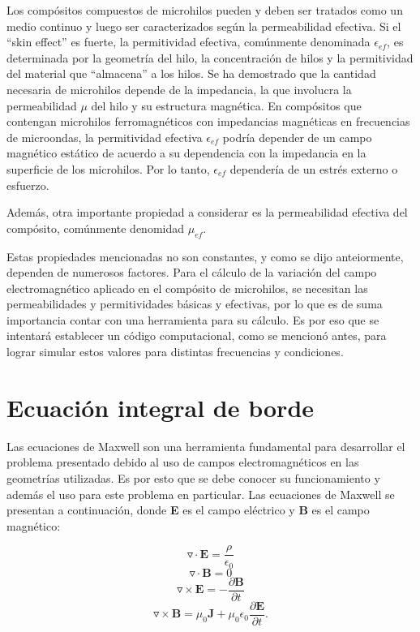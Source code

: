 \documentclass[12pt,letterpaper]{article}
\numberwithin{equation}{section}
\begin{document}
Los compósitos compuestos de microhilos pueden y deben ser tratados como un medio continuo y luego ser caracterizados según la permeabilidad efectiva. Si el ``skin effect'' es fuerte, la permitividad efectiva, comúnmente denominada $\epsilon_{ef}$, es determinada por la geometría del hilo, la concentración de hilos y la permitividad del material que ``almacena'' a los hilos. Se ha demostrado que la cantidad necesaria de microhilos depende de la impedancia, la que involucra la permeabilidad $\mu$ del hilo y su estructura magnética. En compósitos que contengan microhilos ferromagnéticos con impedancias magnéticas en frecuencias de microondas, la permitividad efectiva $\epsilon_{ef}$ podría depender de un campo magnético estático de acuerdo a su dependencia con la impedancia en la superficie de los microhilos. Por lo tanto, $\epsilon_{ef}$ dependería de un estrés externo o esfuerzo. \cite{Wire_theory_2}

Además, otra importante propiedad a considerar es la permeabilidad efectiva del compósito, comúnmente denomidad $\mu_{ef}$. 

Estas propiedades mencionadas no son constantes, y como se dijo anteiormente, dependen de numerosos factores. Para el cálculo de la variación del campo electromagnético aplicado en el compósito de microhilos, se necesitan las permeabilidades y permitividades básicas y efectivas, por lo que es de suma importancia contar con una herramienta para su cálculo. Es por eso que se intentará establecer un código computacional, como se mencionó antes, para lograr simular estos valores para distintas frecuencias y condiciones.
 

\section{Ecuación integral de borde}


Las ecuaciones de Maxwell son una herramienta fundamental para desarrollar el problema presentado debido al uso de campos electromagnéticos en las geometrías utilizadas. Es por esto que se debe conocer su funcionamiento y además el uso para este problema en particular. Las ecuaciones de Maxwell se presentan a continuación, donde \textbf{E} es el campo eléctrico y \textbf{B} es el campo magnético:

\begin{equation}
\triangledown\cdot\textbf{E} = \frac{\rho}{\epsilon_0}
\label{eq:Ley de Gauss}
\end{equation}
\begin{equation}
\triangledown\cdot\textbf{B} = 0
\label{eq:Maxwell no name}
\end{equation}
\begin{equation}
\triangledown\times\textbf{E} = -\frac{\partial\textbf{B}}{\partial t}
\label{eq:Ley de Faraday }
\end{equation}
\begin{equation}
\triangledown\times\textbf{B} = \mu_0 \textbf{J} + \mu_0\epsilon_0\frac{\partial\textbf{E}}{\partial t}.
\label{eq:Ley de Ampere}
\end{equation}
\\
\end{document}
